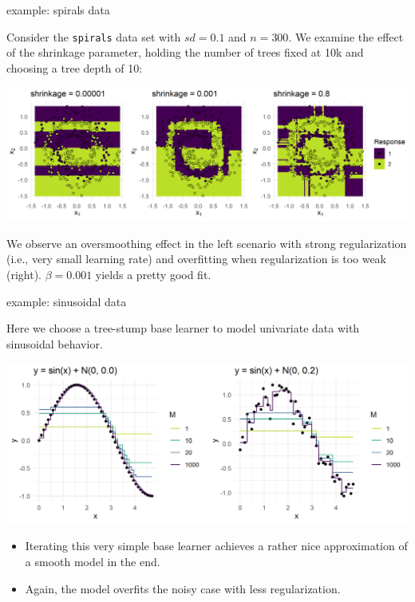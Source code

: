 \begin{vbframe}{example: spirals data}

Consider the \texttt{spirals} data set with $\mathit{sd} = 0.1$ and $n = 300$.
We examine the effect of the shrinkage parameter, holding the number of trees 
fixed at 10k and choosing a tree depth of 10:

\vfill

\includegraphics[width = \textwidth]{figure/gbm_regu_oversmoothing_overfitting}

\vfill

We observe an oversmoothing effect in the left scenario with strong 
regularization (i.e., very small learning rate) and overfitting when 
regularization is too weak (right). $\beta = 0.001$  yields a pretty good fit.

\end{vbframe}


\begin{vbframe}{example: sinusoidal data}

Here we choose a tree-stump base learner to model univariate data 
with sinusoidal behavior.


\begin{center}
  \includegraphics[width=\textwidth]{figure/gbm_sine.png}
\end{center}


\small
\begin{itemize}
  \item Iterating this very simple base learner achieves a rather nice
  approximation of a smooth model in the end.
  \item Again, the model overfits the noisy case with less 
  regularization.
\end{itemize}

\end{vbframe}

\endlecture

